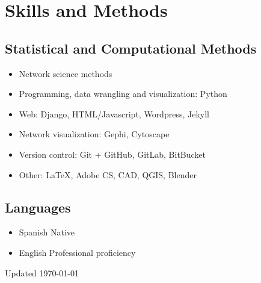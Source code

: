 \documentclass{academiccv}
\begin{document}

\section*{Skills and Methods}
\subsection*{Statistical and Computational Methods}
\begin{itemize}
	\item Network science methods
	\item Programming, data wrangling and visualization: Python
	\item Web: Django, HTML/Javascript, Wordpress, Jekyll
	\item Network visualization: Gephi, Cytoscape
	\item Version control: Git +  {GitHub, GitLab, BitBucket}
	\item Other: \LaTeX, Adobe CS, CAD, QGIS, Blender
\end{itemize}

\subsection*{Languages}
\begin{itemize}
	\item Spanish \tab Native
	\item English \tab Professional proficiency
\end{itemize}

\begin{center}
\vspace{6em}
Updated \monthyeardate\today
\end{center}
\end{document}
